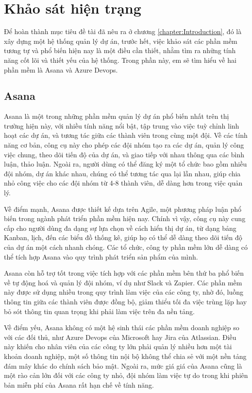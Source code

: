 \documentclass[../DoAn.tex]{subfiles}
\begin{document}
\section{Khảo sát hiện trạng}
\label{section:2.1}
Để hoàn thành mục tiêu đề tài đã nêu ra ở chương \ref{chapter:Introduction}, đó là xây dựng một hệ thống quản lý dự án, trước hết, việc khảo sát các phần mềm tương tự và
phổ biến hiện nay là một điều cần thiết, nhằm tìm ra những tính năng cốt lõi và thiết yếu của hệ thống. Trong phần này, em sẽ tìm hiểu về hai phần mềm là Asana và Azure Devops.

\label{subsection:2.1.1}
\subsection{Asana}
Asana là một trong những phần mềm quản lý dự án phổ biến nhất trên thị trường hiện này, với nhiều tính năng nổi bật, tập trung vào việc tuỳ chỉnh linh hoạt các dự án, và tương tác giữa các thành viên trong cùng một đội. Về các tính năng cơ bản, công cụ này cho phép các đội nhóm tạo ra các dự án,
quản lý công việc chung, theo dõi tiến độ của dự án, và giao tiếp với nhau thông qua các bình luận, thảo luận. Ngoài ra, người dùng có thể đăng ký một tổ chức bao gồm nhiều
đội nhóm, dự án khác nhau, chúng có thể tương tác qua lại lẫn nhau, giúp chia nhỏ công việc cho các đội nhóm từ 4-8 thành viên, dễ dàng hơn trong việc quản lý.

Về điểm mạnh, Asana được thiết kế dựa trên Agile, một phương pháp luận phổ biến trong ngành phát triển phần mềm hiện nay. Chính vì vậy, công cụ này cung cấp cho người dùng
đa dạng sự lựa chọn về cách hiển thị dự án, từ dạng bảng Kanban, lịch, đến các biểu đồ thống kê, giúp họ có thể dễ dàng theo dõi tiến độ của dự án một cách nhanh chóng.
Các tổ chức, công ty phần mềm lớn dễ dàng có thể tích hợp Asana vào quy trình phát triển sản phẩm của mình.

Asana còn hỗ trợ tốt trong việc tích hợp với các phần mềm bên thứ ba phổ biến về tự động hoá và quản lý đội nhóm, ví dụ như Slack và Zapier. Các phần mềm này được sử dụng nhiều
trong quy trình làm việc của các công ty, nhờ đó, luồng thông tin giữa các thành viên được đồng bộ, giảm thiểu tối đa việc trùng lặp hay bỏ sót thông tin quan trọng khi phải
làm việc trên đa nền tảng.

Về điểm yếu, Asana không có một hệ sinh thái các phần mềm doanh nghiệp so với các đối thủ, như Azure Devops của Microsoft hay Jira của Atlassian.
Điều này khiến cho nhân viên của các công ty lớn phải quản lý nhiều hơn một tài khoản doanh nghiệp, một số thông tin nội bộ không thể chia sẻ với một nền tảng đám mây khác
do chính sách bảo mật. Ngoài ra, mức giá giá của Asana cũng là một rào cản lớn đối với các công ty nhỏ, đội nhóm làm việc tự do trong khi phiên bản miễn phí của Asana rất
hạn chế về tính năng.
\end{document}

